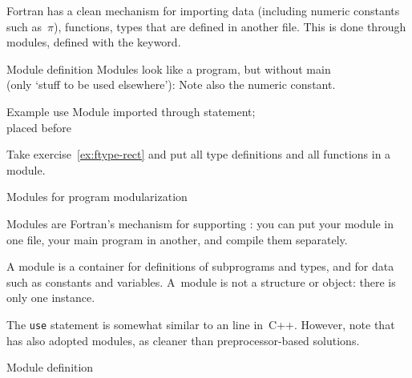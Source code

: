
Fortran has a clean mechanism for importing data (including numeric
constants such as~$\pi$), functions, types
that are defined in another file.
This is done through modules, defined with the  keyword.

\begin{block}{Module definition}
  \label{sl:fmod-def}
  Modules look like a program, but without main\\
  (only `stuff to be used elsewhere'):
  Note also the numeric constant.
\end{block}

\begin{block}{Example use}
  \label{sl:fmod-use}
  Module imported through  statement;\\
  placed before 
\end{block}

\begin{exercise}
  \label{ex:fmod-rect}
  Take exercise~\ref{ex:ftype-rect} and put all type definitions and
  all functions in a module.
\end{exercise}

 {Modules for program modularization}

Modules are Fortran's mechanism for supporting
: you can put your module in one
file, your main program in another, and compile them separately.

A module is a container for definitions of subprograms and types, and
for data such as constants and variables. A~module is not a 
structure or object: there is only one instance.

\begin{remark}
  The \lstinline{use} statement is somewhat similar to
  an  line in~C++.
  However, note that  has also adopted modules,
  as cleaner than preprocessor-based solutions.
\end{remark}

 {Module definition}
\label{sec:modulef}

